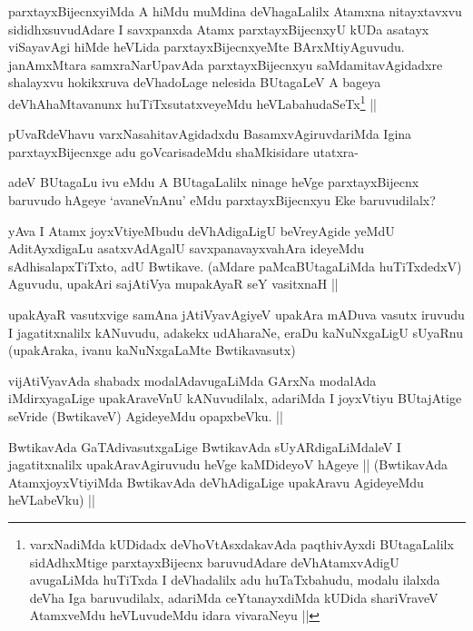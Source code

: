 \begin{artha}
parxtayxBijecnxyiMda A hiMdu muMdina deVhagaLalilx Atamxna nitayxtavxvu sididhxsuvudAdare I savxpanxda Atamx parxtayxBijecnxyU kUDa asatayx viSayavAgi hiMde heVLida parxtayxBijecnxyeMte BArxMtiyAguvudu. janAmxMtara samxraNarUpavAda parxtayxBijecnxyu saMdamitavAgidadxre shalayxvu hokikxruva deVhadoLage nelesida BUtagaLeV A bageya deVhAhaMtavanunx huTiTxsutatxveyeMdu heVLabahudaSeTx\footnote[1]{varxNadiMda kUDidadx deVhoVtAsxdakavAda paqthivAyxdi BUtagaLalilx sidAdhxMtige parxtayxBijecnx baruvudAdare deVhAtamxvAdigU avugaLiMda huTiTxda I deVhadalilx adu huTaTxbahudu, modalu ilalxda deVha Iga baruvudilalx, adariMda ceYtanayxdiMda kUDida shariVraveV AtamxveMdu heVLuvudeMdu idara vivaraNeyu ||} ||
\end{artha}

\begin{artha}
pUvaRdeVhavu varxNasahitavAgidadxdu BasamxvAgiruvdariMda Igina parxtayxBijecnxge adu goVcarisadeMdu shaMkisidare utatxra-
\end{artha}

\begin{artha}
\footnotemark[1]adeV BUtagaLu ivu eMdu A BUtagaLalilx ninage heVge parxtayxBijecnx baruvudo hAgeye `avaneVnAnu' eMdu parxtayxBijecnxyu Eke baruvudilalx?
\end{artha}

\begin{artha}
yAva I Atamx joyxVtiyeMbudu deVhAdigaLigU beVreyAgide yeMdU AditAyxdigaLu asatxvAdAgalU savxpanavayxvahAra ideyeMdu sAdhisalapxTiTxto, adU Bwtikave. (aMdare paMcaBUtagaLiMda huTiTxdedxV) Aguvudu, upakAri sajAtiVya mupakAyaR seY vasitxnaH ||
\end{artha}

\begin{artha}
upakAyaR vasutxvige samAna jAtiVyavAgiyeV upakAra mADuva vasutx iruvudu I jagatitxnalilx kANuvudu, adakekx udAharaNe, eraDu kaNuNxgaLigU sUyaRnu (upakAraka, ivanu kaNuNxgaLaMte Bwtikavasutx)
\end{artha}

\begin{artha}
vijAtiVyavAda shabadx modalAdavugaLiMda GArxNa modalAda iMdirxyagaLige upakAraveVnU kANuvudilalx, adariMda I joyxVtiyu BUtajAtige seVride (BwtikaveV) AgideyeMdu opapxbeVku. ||
\end{artha}

\begin{artha}
BwtikavAda GaTAdivasutxgaLige BwtikavAda sUyARdigaLiMdaleV I jagatitxnalilx upakAravAgiruvudu heVge kaMDideyoV hAgeye || (BwtikavAda AtamxjoyxVtiyiMda BwtikavAda deVhAdigaLige upakAravu AgideyeMdu heVLabeVku) ||
\end{artha}

